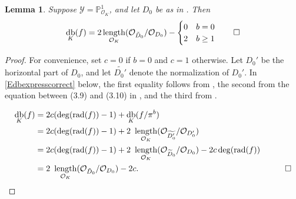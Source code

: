 \documentclass[12pt]{amsart}
\numberwithin{equation}{section}
\newtheorem{lemma}[equation]{Lemma}
\theoremstyle{definition}
\renewcommand{\O}{\mathcal{O}}
\renewcommand{\P}{\mathbb P}
\DeclareMathOperator{\len}{length}
\renewcommand{\l}[2]{\len_{\O_K}(\mathcal{O}_{#1}/\mathcal{O}_{#2})}
\newcommand{\Y}{\mathcal{Y}}
\newcommand{\tx}[1]{\text{#1}}
\DeclareMathOperator{\divi}{div}
\DeclareMathOperator{\db}{db}
\DeclareMathOperator{\rad}{rad}
\DeclareMathOperator{\cdc}{cdc}
\begin{document}
\begin{lemma}\label{Edbexpression}
Suppose $\Y=\P^1_{\O_K}$, and let $D_0$ be as in . Then
 \[ \db_K(f) =2\l{\tilde{D}_0}{D_0}-\begin{cases}
     0&b=0\\
     2&b\geq 1
 \end{cases}\qedhere\] 
\end{lemma}
\begin{proof}
For convenience, set $c=0$ if $b=0$ and $c=1$ otherwise. Let $D_0'$ be the
 horizontal part of $D_0$, and let $\widetilde{D_0'}$ denote the normalization of $D_0'$. In \eqref{Edbexpresscorrect} below, the first equality follows from
    , the second from the equation between (3.9) and
    (3.10) in \cite{OShyper_published}, and the third from
    \cite[(3.9)]{OShyper_published}.

    \begin{equation}\label{Edbexpresscorrect}
    \begin{aligned}
        \db_K(f)&=2c(\deg(\rad(f))-1)+\db_K(f/\pi^b) & \\
        &=2c(\deg(\rad(f))-1)+2\tx{ }\l{\widetilde{D_0'}}{D_0'} & \\
        &=2c(\deg(\rad(f))-1)+2\tx{ }\l{\widetilde{D}_0}{D_0}-2c\deg(\rad(f)) & \\
        &=2\tx{ }\l{\tilde{D}_0}{D_0}-2c.\quad \quad \quad \quad \quad \quad &\qedhere
      \end{aligned}
      \end{equation}
      
\end{proof}

    
\end{document}
